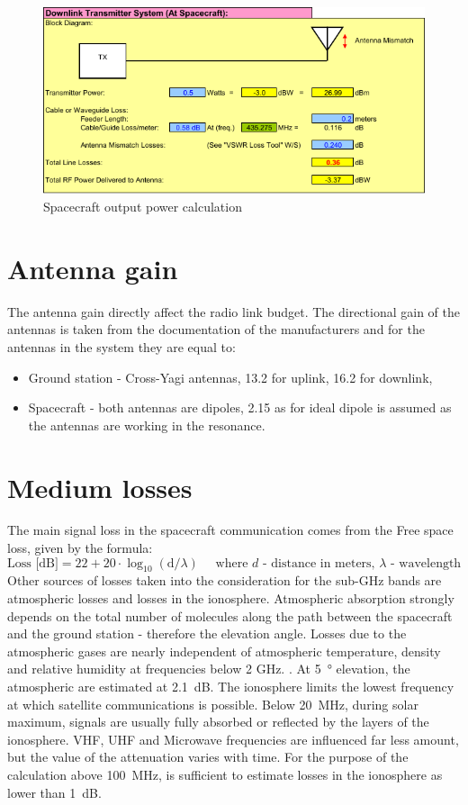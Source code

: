 \begin{figure}
    \centering
    \includegraphics[width=0.8\paperwidth]{img/8/tx_spacecraft.pdf}
    \caption{Spacecraft output power calculation}
    \label{link:tx_spacecraft}
\end{figure}


\section{Antenna gain}
The antenna gain directly affect the radio link budget. The directional gain of the antennas is taken from the documentation of the manufacturers and for the antennas in the system they are equal to:
\begin{itemize}
    \item Ground station - Cross-Yagi antennas, \SI{13.2}{\dBi} for uplink, \SI{16.2}{\dBi} for downlink,
    \item Spacecraft - both antennas are dipoles, \SI{2.15}{\dBi} as for ideal dipole is assumed as the antennas are working in the resonance. 
\end{itemize}


\section{Medium losses}
The main signal loss in the spacecraft communication comes from the Free space loss, given by the formula: 
$$\text{Loss [dB]} = 22 + 20 \cdot \log_{10} (\text{d}/\lambda) \text{~~~~where $d$ - distance in meters, $\lambda$ - wavelength}$$ Other sources of losses taken into the consideration for the sub-GHz bands are atmospheric losses and losses in the ionosphere. Atmospheric absorption strongly depends on the total number of molecules along the path between the spacecraft and the ground station - therefore the elevation angle. Losses due to the atmospheric gases are nearly independent of atmospheric temperature, density and relative humidity at frequencies below 2 GHz. \cite{sat_propagation}. At \SI{5}{\degree} elevation, the atmospheric are estimated at \SI{2.1}{\dB}. The ionosphere limits the lowest frequency at which satellite communications is possible. Below \SI{20}{\MHz}, during solar maximum, signals are usually fully absorbed or reflected by the layers of the ionosphere. VHF, UHF and Microwave frequencies are influenced far less amount, but the value of the attenuation varies with time. For the purpose of the calculation above \SI{100}{\MHz}, is sufficient to estimate losses in the ionosphere as lower than \SI{1}{\dB}.

